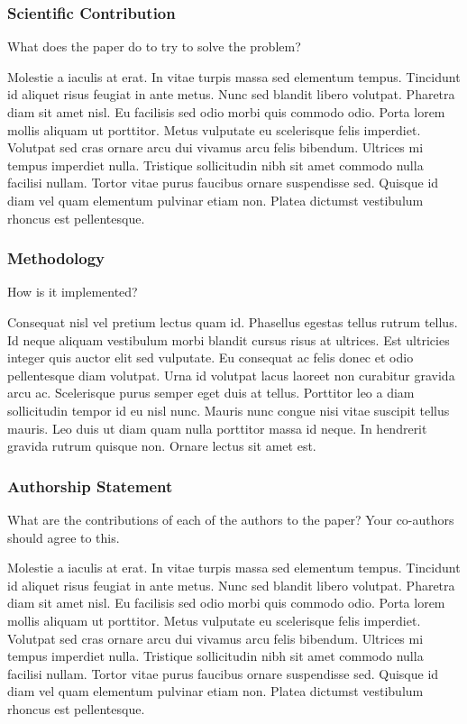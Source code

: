 \subsubsection*{Scientific Contribution}

What does the paper do to try to solve the problem?

\vskip 1cm

Molestie a iaculis at erat. In vitae turpis massa sed elementum tempus. Tincidunt id aliquet risus feugiat in ante metus. Nunc sed blandit libero volutpat. Pharetra diam sit amet nisl. Eu facilisis sed odio morbi quis commodo odio. Porta lorem mollis aliquam ut porttitor. Metus vulputate eu scelerisque felis imperdiet. Volutpat sed cras ornare arcu dui vivamus arcu felis bibendum. Ultrices mi tempus imperdiet nulla. Tristique sollicitudin nibh sit amet commodo nulla facilisi nullam. Tortor vitae purus faucibus ornare suspendisse sed. Quisque id diam vel quam elementum pulvinar etiam non. Platea dictumst vestibulum rhoncus est pellentesque.


\subsubsection*{Methodology}

How is it implemented?

\vskip 1cm

Consequat nisl vel pretium lectus quam id. Phasellus egestas tellus rutrum tellus. Id neque aliquam vestibulum morbi blandit cursus risus at ultrices. Est ultricies integer quis auctor elit sed vulputate. Eu consequat ac felis donec et odio pellentesque diam volutpat. Urna id volutpat lacus laoreet non curabitur gravida arcu ac. Scelerisque purus semper eget duis at tellus. Porttitor leo a diam sollicitudin tempor id eu nisl nunc. Mauris nunc congue nisi vitae suscipit tellus mauris. Leo duis ut diam quam nulla porttitor massa id neque. In hendrerit gravida rutrum quisque non. Ornare lectus sit amet est.


\ifx\authorshipStatementSection\undefined
\subsubsection*{Authorship Statement}


What are the contributions of each of the authors to the paper? Your co-authors should agree to this. 

\vskip 1cm

Molestie a iaculis at erat. In vitae turpis massa sed elementum tempus. Tincidunt id aliquet risus feugiat in ante metus. Nunc sed blandit libero volutpat. Pharetra diam sit amet nisl. Eu facilisis sed odio morbi quis commodo odio. Porta lorem mollis aliquam ut porttitor. Metus vulputate eu scelerisque felis imperdiet. Volutpat sed cras ornare arcu dui vivamus arcu felis bibendum. Ultrices mi tempus imperdiet nulla. Tristique sollicitudin nibh sit amet commodo nulla facilisi nullam. Tortor vitae purus faucibus ornare suspendisse sed. Quisque id diam vel quam elementum pulvinar etiam non. Platea dictumst vestibulum rhoncus est pellentesque.

